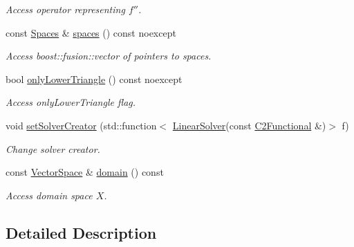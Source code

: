 \begin{DoxyCompactItemize}
\begin{DoxyCompactList}\small\item\em Access operator representing $f''$. \end{DoxyCompactList}\item 
const \hyperlink{classSpacy_1_1Kaskade_1_1C2Functional_afb866208161b4421f74aab07f50af065}{Spaces} \& \hyperlink{classSpacy_1_1Kaskade_1_1C2Functional_ac334455723ea59d001fef33e056b1ea7}{spaces} () const noexcept\hypertarget{classSpacy_1_1Kaskade_1_1C2Functional_ac334455723ea59d001fef33e056b1ea7}{}\label{classSpacy_1_1Kaskade_1_1C2Functional_ac334455723ea59d001fef33e056b1ea7}

\begin{DoxyCompactList}\small\item\em Access boost\+::fusion\+::vector of pointers to spaces. \end{DoxyCompactList}\item 
bool \hyperlink{classSpacy_1_1Kaskade_1_1C2Functional_a37152b2b1413e611d229a61318b86768}{only\+Lower\+Triangle} () const noexcept
\begin{DoxyCompactList}\small\item\em Access only\+Lower\+Triangle flag. \end{DoxyCompactList}\item 
void \hyperlink{classSpacy_1_1Kaskade_1_1C2Functional_a3b69bdfbeec77616425096b435573094}{set\+Solver\+Creator} (std\+::function$<$ \hyperlink{namespaceSpacy_adcd0d78166a9c972b8a2e5a689fc2d03}{Linear\+Solver}(const \hyperlink{classSpacy_1_1Kaskade_1_1C2Functional}{C2\+Functional} \&)$>$ f)
\begin{DoxyCompactList}\small\item\em Change solver creator. \end{DoxyCompactList}\item 
const \hyperlink{classSpacy_1_1VectorSpace}{Vector\+Space} \& \hyperlink{classSpacy_1_1FunctionalBase_a2d3397deb9fa1ad85ed04e37a03b3aa6}{domain} () const \hypertarget{classSpacy_1_1FunctionalBase_a2d3397deb9fa1ad85ed04e37a03b3aa6}{}\label{classSpacy_1_1FunctionalBase_a2d3397deb9fa1ad85ed04e37a03b3aa6}

\begin{DoxyCompactList}\small\item\em Access domain space $X$. \end{DoxyCompactList}\end{DoxyCompactItemize}


\subsection{Detailed Description}
